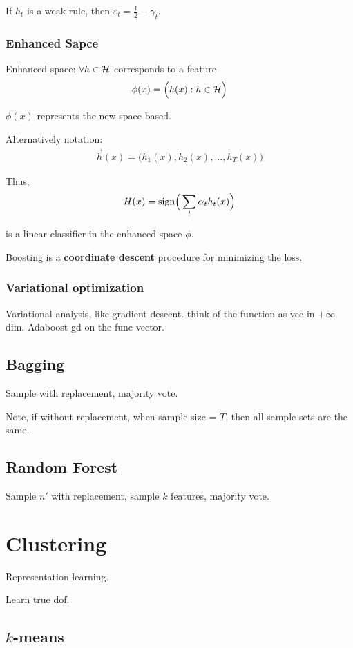\documentclass[a4paper]{report}
\begin{document}
If $h_t$ is a weak rule, then $\varepsilon_t=\frac{1}{2}-\gamma_t$. 

\subsection{Enhanced Sapce}
Enhanced space: $\forall h \in \mathcal{H}$ corresponds to a feature 
$$
\phi(x) = \Big(h(x):h\in \mathcal{H}\Big)
$$

$\phi(x)$ represents the new space based. 

Alternatively notation:
\begin{align*}
\vec{h}(x) = \Big(h_1(x), h_2(x), ..., h_{T}(x)\Big)
\end{align*}

Thus, 
$$
H(x) = \text{sign}\Big(\sum_t \alpha_t h_t(x)\Big)
$$

is a linear classifier in the enhanced space $\phi$. 

Boosting is a \textbf{coordinate descent} procedure for minimizing the loss. 

\subsection{Variational optimization}
Variational analysis, like gradient descent. think of the function as vec in $+\infty$ dim. Adaboost gd on the func vector.

\section{Bagging}
Sample with replacement, majority vote. 

Note, if without replacement, when sample size = $T$, then all sample sets are the same. 

\section{Random Forest}
Sample $n'$ with replacement, sample $k$ features, majority vote.

\chapter{Clustering}
Representation learning. 

Learn true dof. 

\section{$k$-means}
\end{document}
